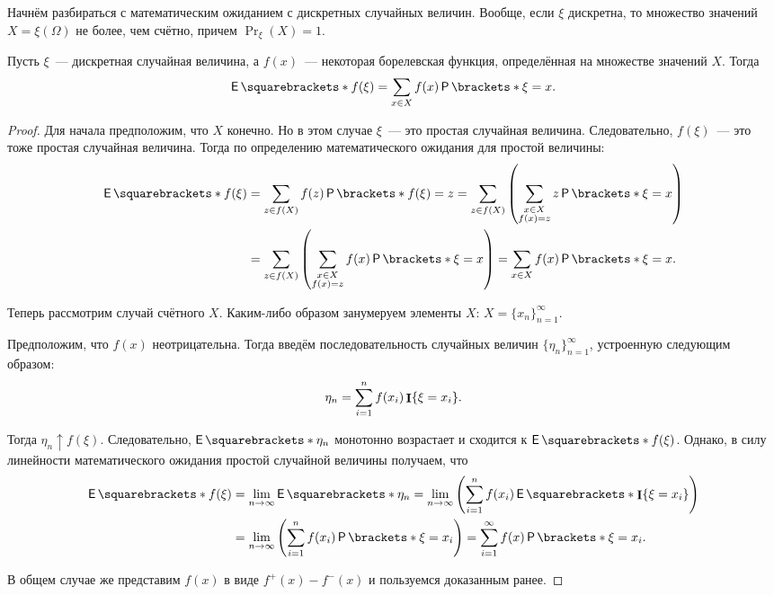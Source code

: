 Начнём разбираться с математическим ожиданием с дискретных случайных величин. Вообще, если \(\xi\) дискретна, то множество значений \(X = \xi(\Omega)\) не более, чем счётно, причем \(\Pr_{\xi}(X) = 1\).
\begin{theorem}
	Пусть \(\xi\)~--- дискретная случайная величина, а \(f(x)\)~--- некоторая борелевская функция, определённая на множестве значений \(X\). Тогда
	\[
	\E{f(\xi)} = \sum\limits_{x \in X} f(x)\Pr{\xi = x}.
	\]
\end{theorem}
\begin{proof}
	Для начала предположим, что \(X\) конечно. Но в этом случае \(\xi\)~--- это простая случайная величина. Следовательно, \(f(\xi)\)~--- это тоже простая случайная величина. Тогда по определению математического ожидания для простой величины:
	\begin{align}
		\E{f(\xi)} &= \sum\limits_{z \in f(X)} f(z)\Pr{f(\xi) = z} = \sum\limits_{z \in f(X)}\left(\sum\limits_{\substack{x \in X \\ f(x) = z}} z\Pr{\xi = x}\right) \\
		&= \sum\limits_{z \in f(X)}\left(\sum\limits_{\substack{x \in X \\ f(x) = z}} f(x)\Pr{\xi = x}\right) = \sum\limits_{x \in X} f(x)\Pr{\xi = x}.
	\end{align}
	
	Теперь рассмотрим случай счётного \(X\). Каким-либо образом занумеруем элементы \(X\): \(X = \{x_n\}_{n = 1}^{\infty}\).
	
	Предположим, что \(f(x)\) неотрицательна. Тогда введём последовательность случайных величин \(\{\eta_n\}_{n = 1}^{\infty}\), устроенную следующим образом:
	\[
	\eta_n = \sum_{i = 1}^{n} f(x_i)\mathop{\mathbf{I}}\{\xi = x_i\}.
	\]
	
	Тогда \(\eta_n \uparrow f(\xi)\). Следовательно, \(\E{\eta_n}\) монотонно возрастает и сходится к \(\E{f(\xi)}\). Однако, в силу линейности математического ожидания простой случайной величины получаем, что
	\begin{align}
		\E{f(\xi)} &= \lim\limits_{n \to \infty} \E{\eta_n} = \lim\limits_{n \to \infty} \left(\sum_{i = 1}^{n} f(x_i)\E{\I\{\xi = x_i\}}\right) \\
		&= \lim\limits_{n \to \infty} \left(\sum_{i = 1}^{n} f(x_i)\Pr{\xi = x_i}\right) = \sum_{i = 1}^{\infty} f(x)\Pr{\xi = x_i}.
	\end{align}
	
	В общем случае же представим \(f(x)\) в виде \(f^{+}(x) - f^{-}(x)\) и пользуемся доказанным ранее.
\end{proof}

